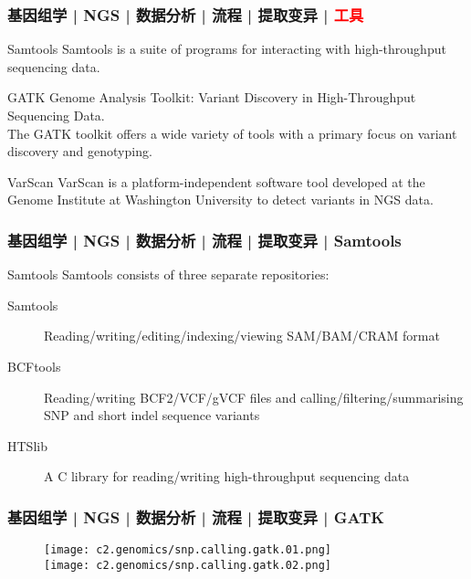 \begin{frame}
  \frametitle{基因组学 | NGS | 数据分析 | 流程 | 提取变异 | \textcolor{red}{工具}}
  \begin{block}{Samtools}
    Samtools is a suite of programs for interacting with high-throughput sequencing data.
  \end{block}
  \pause
  \begin{block}{GATK}
    Genome Analysis Toolkit: Variant Discovery in High-Throughput Sequencing Data.\\
    The GATK toolkit offers a wide variety of tools with a primary focus on variant discovery and genotyping.
  \end{block}
  \pause
  \begin{block}{VarScan}
    VarScan is a platform-independent software tool developed at the Genome Institute at Washington University to detect variants in NGS data.
  \end{block}
\end{frame}

\begin{frame}
  \frametitle{基因组学 | NGS | 数据分析 | 流程 | 提取变异 | Samtools}
  \begin{block}{Samtools}
    Samtools consists of three separate repositories:
    \begin{description}
      \item[Samtools] Reading/writing/editing/indexing/viewing SAM/BAM/CRAM format
      \item[BCFtools] Reading/writing BCF2/VCF/gVCF files and calling/filtering/summarising SNP and short indel sequence variants
      \item[HTSlib] A C library for reading/writing high-throughput sequencing data
    \end{description}
  \end{block}
\end{frame}

\begin{frame}
  \frametitle{基因组学 | NGS | 数据分析 | 流程 | 提取变异 | GATK}
  \begin{figure}
    \centering
    \texttt{[image: c2.genomics/snp.calling.gatk.01.png]}\\
    \vspace{1em}
    \texttt{[image: c2.genomics/snp.calling.gatk.02.png]}
  \end{figure}
\end{frame}

